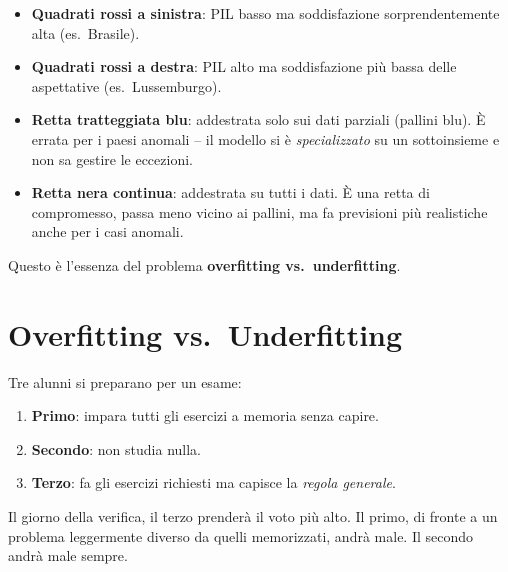 \begin{itemize}
    \item \textbf{Quadrati rossi a sinistra}: PIL basso ma soddisfazione sorprendentemente alta (es.\ Brasile).
    \item \textbf{Quadrati rossi a destra}: PIL alto ma soddisfazione più bassa delle aspettative (es.\ Lussemburgo).
    \item \textbf{Retta tratteggiata blu}: addestrata solo sui dati parziali (pallini blu). È errata per i paesi anomali -- il modello si è \emph{specializzato} su un sottoinsieme e non sa gestire le eccezioni.
    \item \textbf{Retta nera continua}: addestrata su tutti i dati. È una retta di compromesso, passa meno vicino ai pallini, ma fa previsioni più realistiche anche per i casi anomali.
\end{itemize}

Questo è l'essenza del problema \textbf{overfitting vs.\ underfitting}.

\section{Overfitting vs.\ Underfitting}
\label{sec:overfit}
\begin{defbox}
Tre alunni si preparano per un esame:
\begin{enumerate}
    \item \textbf{Primo}: impara tutti gli esercizi a memoria senza capire.
    \item \textbf{Secondo}: non studia nulla.
    \item \textbf{Terzo}: fa gli esercizi richiesti ma capisce la \emph{regola generale}.
\end{enumerate}
Il giorno della verifica, il terzo prenderà il voto più alto. Il primo, di fronte a un problema leggermente diverso da quelli memorizzati, andrà male. Il secondo andrà male sempre.
\end{defbox}


